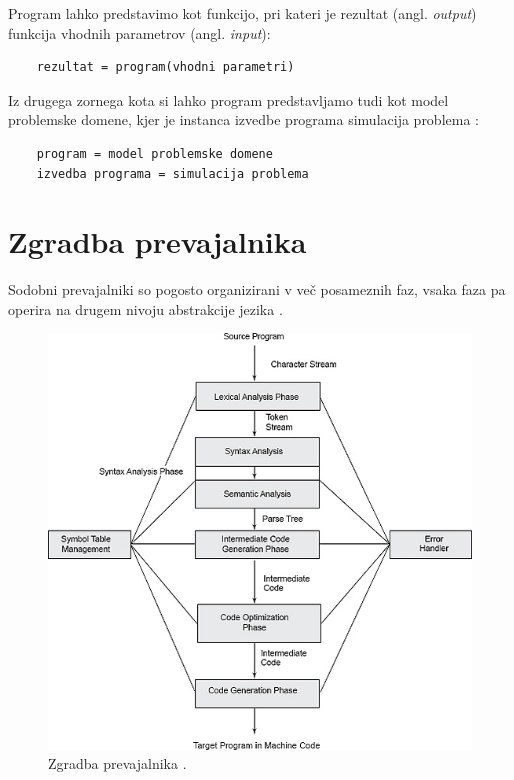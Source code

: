 \documentclass[a4paper, 12p]{book}
\begin{document}
Program lahko predstavimo kot funkcijo, pri kateri je rezultat (angl. \textit{output}) funkcija vhodnih parametrov (angl. \textit{input}):
\begin{lstlisting}
	rezultat = program(vhodni parametri)
\end{lstlisting}

Iz drugega zornega kota si lahko program predstavljamo tudi kot model problemske domene, kjer je instanca izvedbe programa simulacija problema \cite{computationalModel}:
\begin{lstlisting}
	program = model problemske domene
	izvedba programa = simulacija problema
\end{lstlisting}

\section{Zgradba prevajalnika}

Sodobni prevajalniki so pogosto organizirani v več posameznih faz, vsaka faza pa operira na drugem nivoju abstrakcije jezika \cite{modernCompiler}.

\begin{figure}[h]
	\begin{center}
		\includegraphics[width=1\textwidth]{resources/compilerStructure.jpg}
	\end{center}
	\caption{Zgradba prevajalnika \cite{compilerStructure}.}
	\label{pic1}
\end{figure}
\end{document}
